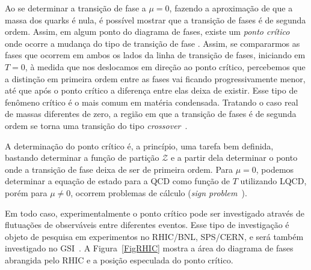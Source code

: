 
Ao se determinar a transição de fase a $\mu = 0$, fazendo a aproximação de que a massa dos quarks é nula, é possível mostrar que a transição de fases é de segunda ordem. Assim, em algum ponto do diagrama de fases, existe um \emph{ponto crítico} onde ocorre a mudança do tipo de transição de fase \cite{Stephanov2004}. Assim, se compararmos as fases que ocorrem em ambos os lados da linha de transição de fases, iniciando em $T = 0$, à medida que nos deslocamos em direção ao ponto crítico, percebemos que a distinção em primeira ordem entre as fases vai ficando progressivamente menor, até que após o ponto crítico a diferença entre elas deixa de existir. Esse tipo de fenômeno crítico é o mais comum em matéria condensada. Tratando o caso real de massas diferentes de zero, a região em que a transição de fases é de segunda ordem se torna uma transição do tipo \emph{crossover}~\cite{Stephanov2004}.

A determinação do ponto crítico é, a princípio, uma tarefa bem definida, bastando determinar a função de partição $\mathcal{Z}$ e a partir dela determinar o ponto onde a transição de fase deixa de ser de primeira ordem. Para $\mu = 0$, podemos determinar a equação de estado para a QCD como função de $T$ utilizando LQCD, porém para $\mu \neq 0$, ocorrem problemas de cálculo (\emph{sign problem}~\cite{Stephanov2004}).


Em todo caso, experimentalmente o ponto crítico pode ser investigado através de flutuações de observáveis entre diferentes eventos. Esse tipo de investigação é objeto de pesquisa em experimentos no RHIC/BNL, SPS/CERN, e será também investigado no GSI~\cite{Buballa,Stephanov2006}. A Figura~\ref{FigRHIC}\cite{RHIC} mostra a área do diagrama de fases abrangida pelo RHIC e a posição especulada do ponto crítico.

